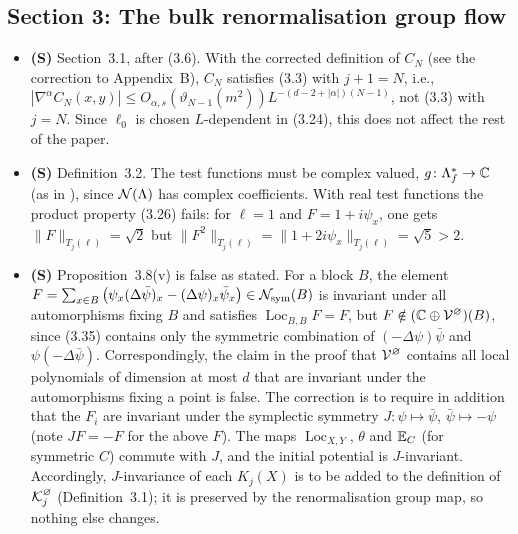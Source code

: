 \documentclass[11pt]{amsart}
\numberwithin{equation}{section}
\newcommand{\cVbulk}{\cV^\varnothing}
\newcommand{\cKbulk}{\cK^\varnothing}
\newcommand{\Loc}{\operatorname{Loc}}
\begin{document}
\subsection*{Section 3: The bulk renormalisation group flow}

\begin{itemize}
\item \textbf{(S)} Section~3.1, after (3.6). With the corrected definition of $C_N$ (see the
  correction to Appendix~B), $C_N$ satisfies (3.3) with $j+1=N$, i.e.,
  $|\nabla^\alpha C_N(x,y)|\le O_{\alpha,s}(\vartheta_{N-1}(m^2))L^{-(d-2+|\alpha|)(N-1)}$, not
  (3.3) with $j=N$. Since $\ell_0$ is chosen $L$-dependent in (3.24), this does not affect the
  rest of the paper.

\item \textbf{(S)} Definition~3.2. The test functions must be complex valued,
  $g\colon\Lambda_f^*\to\mathbb{C}$ (as in \cite{MR3332938}), since $\mathcal N(\Lambda)$ has complex
  coefficients. With real test functions the product property (3.26) fails: for $\ell=1$ and
  $F=1+i\psi_x$, one gets $\|F\|_{T_j(\ell)}=\sqrt2$ but $\|F^2\|_{T_j(\ell)}=\|1+2i\psi_x\|_{T_j(\ell)}=\sqrt5>2$.

\item \textbf{(S)} Proposition~3.8(v) is false as stated. For a block $B$, the element
  $F=\sum_{x\in B}\left({\psi_x(\Delta\bar\psi)_x-(\Delta\psi)_x\bar\psi_x}\right)\in\mathcal N_{\rm sym}(B)$ is
  invariant under all automorphisms fixing $B$ and satisfies $\Loc_{B,B}F=F$, but
  $F\notin(\C\oplus\cVbulk)(B)$, since (3.35) contains only the symmetric combination of
  $(-\Delta\psi)\bar\psi$ and $\psi(-\Delta\bar\psi)$. Correspondingly, the claim in the proof that
  $\cVbulk$ contains all local polynomials of dimension at most $d$ that are invariant under
  the automorphisms fixing a point is false. The correction is to require in addition that
  the $F_i$ are invariant under the symplectic symmetry $J\colon\psi\mapsto\bar\psi$,
  $\bar\psi\mapsto-\psi$ (note $JF=-F$ for the above $F$). The maps $\Loc_{X,Y}$, $\theta$ and
  $\mathbb{E}_C$ (for symmetric $C$) commute with $J$, and the initial potential is $J$-invariant.
  Accordingly, $J$-invariance of each $K_j(X)$ is to be added to the definition of
  $\cKbulk_j$ (Definition~3.1); it is preserved by the renormalisation group map, so nothing
  else changes.


\end{itemize}
\end{document}
